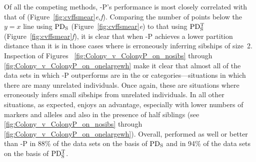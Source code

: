     
Of all the competing methods, \colony-P's performance is most closely correlated with that of \colony{} 
(Figure~\ref{fig:cvffsmear}{\em e,f}).  Comparing the number of points below the $y=x$ line using $\mathrm{PD_S}
$ (Figure~\ref{fig:cvffsmear}{\em e}) to that using $\mathrm{PD_S^T}$ (Figure~\ref{fig:cvffsmear}{\em f}), it is 
clear that when \colony{}-P achieves a lower partition distance than \colony{} it is in those cases 
where \colony{} is erroneously inferring sibships of size~2.  Inspection of Figures~
\ref{fig:Colony_v_ColonyP_on_nosibs} through \ref{fig:Colony_v_ColonyP_on_onelargewh} make it clear 
that almost all of the data sets in which \colony{}-P outperforms \colony{} are in the \nosibs{} or 
\onelargenoh{} categories---situations in which there are many unrelated individuals.  Once again, 
these are situations where \colony{} erroneously infers small sibships from unrelated individuals.  In 
all other situations, as expected, \colony{} enjoys an advantage, especially with lower numbers of 
markers and alleles and also in the presence of half siblings (see \ref{fig:Colony_v_ColonyP_on_nosibs} 
through \ref{fig:Colony_v_ColonyP_on_onelargewh}). Overall, \colony{} performed as well or better than 
\colony{}-P in 88\% of the data sets on the basis of $\mathrm{PD_S}$ and in 94\% of the data sets on the basis 
of $\mathrm{PD_S^T}$.

